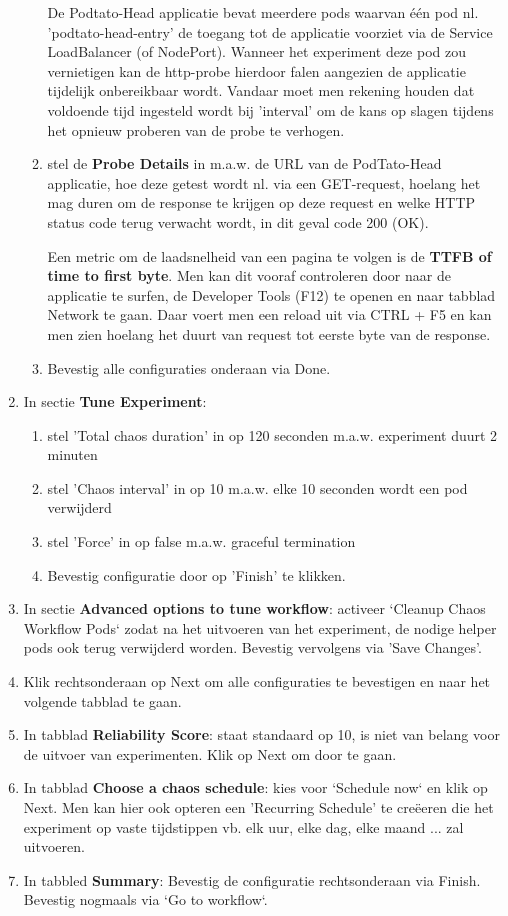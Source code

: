 \begin{enumerate}
\begin{enumerate}
        De Podtato-Head applicatie bevat meerdere pods waarvan één pod nl. 'podtato-head-entry' de toegang tot de applicatie voorziet via de Service LoadBalancer (of NodePort). Wanneer het experiment deze pod zou vernietigen kan de http-probe hierdoor falen aangezien de applicatie tijdelijk onbereikbaar wordt. Vandaar moet men rekening houden dat voldoende tijd ingesteld wordt bij 'interval' om de kans op slagen tijdens het opnieuw proberen van de probe te verhogen.  
        
        \item stel de {\bf Probe Details} in m.a.w. de URL van de PodTato-Head applicatie, hoe deze getest wordt nl. via een GET-request, hoelang het mag duren om de response te krijgen op deze request en welke HTTP status code terug verwacht wordt, in dit geval code 200 (OK).
        
        Een metric om de laadsnelheid van een pagina te volgen is de {\bf TTFB of time to first byte}. Men kan dit vooraf controleren door naar de applicatie te surfen, de Developer Tools (F12) te openen en naar tabblad Network te gaan. Daar voert men een reload uit via CTRL + F5 en kan men zien hoelang het duurt van request tot eerste byte van de response. \autocite{Mensink2022}
        
        \item Bevestig alle configuraties onderaan via Done.  
    \end{enumerate}
    \item In sectie {\bf Tune Experiment}:
    \begin{enumerate}
        \item stel 'Total chaos duration' in op 120 seconden m.a.w. experiment duurt 2 minuten
        \item stel 'Chaos interval' in op 10 m.a.w. elke 10 seconden wordt een pod verwijderd
        \item stel 'Force' in op false m.a.w. graceful termination \autocite{Dinesh2018a}
        \item Bevestig configuratie door op 'Finish' te klikken.
    \end{enumerate}  
    \item In sectie {\bf Advanced options to tune workflow}: activeer `Cleanup Chaos Workflow Pods` zodat na het uitvoeren van het experiment, de nodige helper pods ook terug verwijderd worden.
    Bevestig vervolgens via 'Save Changes'.
    \item Klik rechtsonderaan op Next om alle configuraties te bevestigen en naar het volgende tabblad te gaan.
    \item In tabblad {\bf Reliability Score}: staat standaard op 10, is niet van belang voor de uitvoer van experimenten. Klik op Next om door te gaan.
    \item In tabblad {\bf Choose a chaos schedule}: kies voor `Schedule now` en klik op Next. Men kan hier ook opteren een 'Recurring Schedule' te creëeren die het experiment op vaste tijdstippen vb. elk uur, elke dag, elke maand ... zal uitvoeren.
    \item In tabbled {\bf Summary}: Bevestig de configuratie rechtsonderaan via Finish. Bevestig nogmaals via `Go to workflow`.  
\end{enumerate}